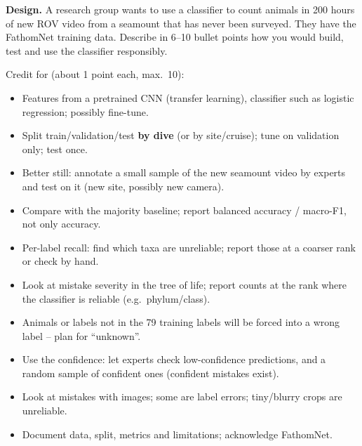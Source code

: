 \documentclass[11pt,a4paper,addpoints]{exam}
\newcommand{\answerspace}[1]{\ifprintanswers\medskip\else\vspace{#1}\fi}
\newcommand{\qbreak}{\ifprintanswers\else\newpage\fi}
\begin{document}
\begin{questions}
\qbreak
\question[10] \textbf{Design.} A research group wants to use a classifier to count animals in 200 hours of new ROV video from a seamount that has never been surveyed. They have the FathomNet training data. Describe in 6--10 bullet points how you would build, test and use the classifier responsibly.
\begin{solution}Credit for (about 1 point each, max.\ 10):
\begin{itemize}
\item Features from a pretrained CNN (transfer learning), classifier such as logistic regression; possibly fine-tune.
\item Split train/validation/test \textbf{by dive} (or by site/cruise); tune on validation only; test once.
\item Better still: annotate a small sample of the new seamount video by experts and test on it (new site, possibly new camera).
\item Compare with the majority baseline; report balanced accuracy / macro-F1, not only accuracy.
\item Per-label recall: find which taxa are unreliable; report those at a coarser rank or check by hand.
\item Look at mistake severity in the tree of life; report counts at the rank where the classifier is reliable (e.g.\ phylum/class).
\item Animals or labels not in the 79 training labels will be forced into a wrong label -- plan for ``unknown''.
\item Use the confidence: let experts check low-confidence predictions, and a random sample of confident ones (confident mistakes exist).
\item Look at mistakes with images; some are label errors; tiny/blurry crops are unreliable.
\item Document data, split, metrics and limitations; acknowledge FathomNet.
\end{itemize}\end{solution}
\answerspace{9.1cm}
\end{questions}
\end{document}
